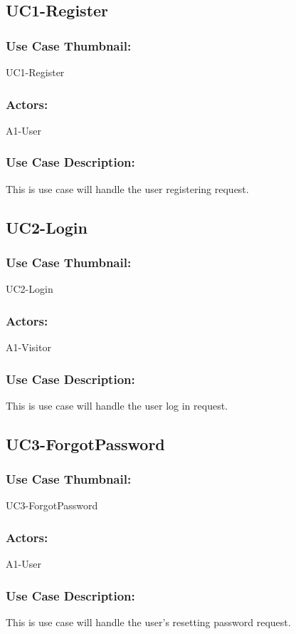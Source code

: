 \documentclass[11pt, openany]{report}
\begin{document}
\subsection{UC1-Register}
\label{sUC1}
\subsubsection*{Use Case Thumbnail:}
UC1-Register
\subsubsection*{Actors:}
A1-User
\subsubsection*{Use Case Description:}
This is use case will handle the user registering request.

\subsection{UC2-Login}
\label{sUC2}
\subsubsection*{Use Case Thumbnail:}
UC2-Login
\subsubsection*{Actors:}
A1-Visitor
\subsubsection*{Use Case Description:}
This is use case will handle the user log in request.

\subsection{UC3-ForgotPassword}
\label{sUC3}
\subsubsection*{Use Case Thumbnail:}
UC3-ForgotPassword
\subsubsection*{Actors:}
A1-User
\subsubsection*{Use Case Description:}
This is use case will handle the user's resetting password request. \\
\end{document}
